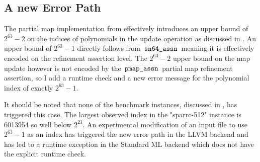 \subsection{A new Error Path}\label{sec:a-new-error-path}
The partial map implementation from  effectively introduces an upper bound of $2^{63}-2$ on the indices of polynomials in the update operation as discussed in .
An upper bound of $2^{63}-1$ directly follows from $\,\text{\ttfamily sn64\_assn}\,$ meaning it is effectively encoded on the refinement assertion level.
The $2^{63}-2$ upper bound on the map update however is not encoded by the $\,\text{\ttfamily pmap\_assn}\,$ partial map refinement assertion, so I add a runtime check and a new error message for the polynomial index of exactly $2^{63}-1$.

It should be noted that none of the benchmark instances, discussed in , has triggered this case.
The largest observed index in the "sparrc-512" instance is 6013954 so well below $2^{23}$.
An experimental modification of an input file to use $2^{63}-1$ as an index has triggered the new error path in the LLVM backend and has led to a runtime exception in the Standard ML backend which does not have the explicit runtime check.
